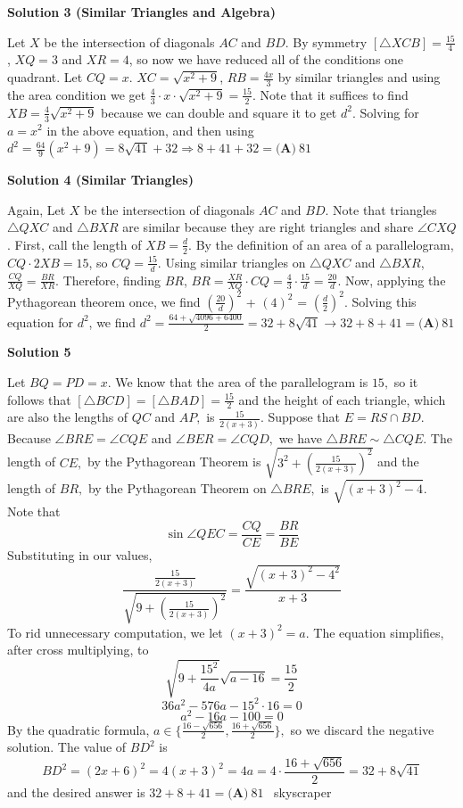 \begin{enumerate}
\textbf{Solution 3 (Similar Triangles and Algebra)}

Let $X$ be the intersection of diagonals $AC$ and $BD$. By symmetry $[\triangle XCB] = \frac{15}{4}$, $XQ = 3$ and $XR = 4$, so now we have reduced all of the conditions one quadrant. Let $CQ = x$. $XC = \sqrt{x^2+9}$, $RB = \frac{4x}{3}$ by similar triangles and using the area condition we get $\frac{4}{3} \cdot x \cdot \sqrt{x^2+9} = \frac{15}{2}$. Note that it suffices to find $XB = \frac{4}{3}\sqrt{x^2+9}$ because we can double and square it to get $d^2$. Solving for $a = x^2$ in the above equation, and then using $d^2 = \frac{64}{9}(x^2+9) = 8\sqrt{41} + 32 \Rightarrow 8+41+32=\boxed{\textbf{(A)} ~81}$




\textbf{Solution 4 (Similar Triangles)}

Again, Let $X$ be the intersection of diagonals $AC$ and $BD$. Note that triangles $\triangle QXC$ and $\triangle BXR$ are similar because they are right triangles and share $\angle CXQ$. First, call the length of $XB = \frac{d}{2}$. By the definition of an area of a parallelogram, $CQ \cdot 2XB = 15$, so $CQ = \frac{15}{d}$. Using similar triangles on $\triangle QXC$ and $\triangle BXR$, $\frac{CQ}{XQ} = \frac{BR}{XR}$. Therefore, finding $BR$, $BR = \frac{XR}{XQ} \cdot CQ = \frac{4}{3} \cdot \frac{15}{d} = \frac{20}{d}$. Now, applying the Pythagorean theorem once, we find $(\frac{20}{d}) ^2$ + $(4)^2$ = $(\frac{d}{2}) ^2$. Solving this equation for $d^2$, we find $d^2=\frac{64+\sqrt{4096+6400}}{2}=32+8\sqrt{41} \rightarrow 32+8+41= \boxed{\textbf{(A)} ~81}$




\textbf{Solution 5}

Let $BQ = PD = x.$ We know that the area of the parallelogram is $15,$ so it follows that $[\triangle{BCD}] = [\triangle{BAD}] = \frac{15}{2}$ and the height of each triangle, which are also the lengths of $QC$ and $AP,$ is $\frac{15}{2(x+3)}.$ Suppose that $E = RS \cap BD.$ Because $\angle{BRE} = \angle{CQE}$ and $\angle{BER} = \angle{CQD},$ we have $\triangle{BRE} \sim \triangle{CQE}.$ The length of $CE,$ by the Pythagorean Theorem is $\sqrt{3^2+(\frac{15}{2(x+3)})^2}$ and the length of $BR,$ by the Pythagorean Theorem on $\triangle{BRE},$ is $\sqrt{(x+3)^2 - 4}.$ Note that
 \[\sin{\angle QEC} = \frac{CQ}{CE} = \frac{BR}{BE}\]Substituting in our values,
 \[\frac{\frac{15}{2(x+3)}}{\sqrt{9+(\frac{15}{2(x+3)})^2}} = \frac{\sqrt{(x+3)^2 - 4^2}}{x+3}\]To rid unnecessary computation, we let $(x+3)^2 = a.$ The equation simplifies, after cross multiplying, to
 \[\sqrt{9+\frac{15^2}{4a}} \sqrt{a-16 } = \frac{15}{2}\]
 \[36a^2 - 576a - 15^2\cdot 16 = 0\]
 \[a^2-16a-100 =0\]By the quadratic formula, $a \in \{\frac{16 - \sqrt{656}}{2}, \frac{16 + \sqrt{656}}{2}\},$ so we discard the negative solution. The value of $BD^2$ is 
 \[BD^2 = (2x+6)^2 = 4(x+3)^2 = 4a = 4 \cdot \frac{16 + \sqrt{656}}{2} = 32+8\sqrt{41}\] and the desired answer is $32+8+41 = \boxed{\textbf{(A)} ~81}$ ~skyscraper


\end{enumerate}
